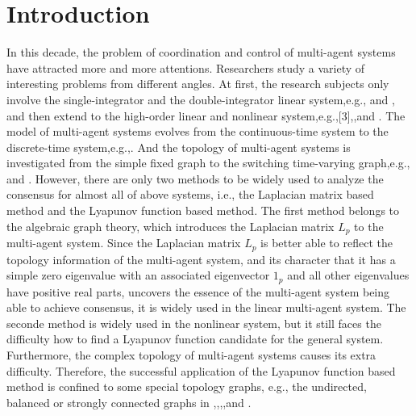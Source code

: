 \documentclass[english]{cccconf}
\begin{document}
\section{Introduction}
In this decade, the problem of coordination and control of multi-agent systems have attracted more and more attentions.  Researchers study a variety of interesting problems from different angles. At first, the research subjects only involve the single-integrator and the double-integrator linear system,e.g.,\cite{Ren2008} and \cite{Mesbahi2010}, and then extend to the high-order linear and nonlinear system,e.g.,[3],\cite{Kim2011},and \cite{Xi2012}. The model of multi-agent systems evolves from the continuous-time system to the discrete-time system,e.g.,\cite{Su2012}. And the topology of multi-agent systems is investigated from the simple fixed graph to the switching time-varying graph,e.g.,\cite{Ren2005} and \cite{Olfati2004}. However, there are only two methods to be widely used to analyze the consensus for  almost all of above systems, i.e., the Laplacian matrix  based method and the Lyapunov function based method. The first method belongs to the algebraic graph theory, which introduces the Laplacian matrix $L_p$ to the multi-agent system. Since the Laplacian matrix $L_p$ is better able to reflect the topology information of the multi-agent system, and its character that it has a simple zero eigenvalue with an associated eigenvector $1_p$  and all other eigenvalues have positive real parts\cite{Ren2008}, uncovers the essence of the multi-agent system being able to achieve consensus, it is widely used in the linear multi-agent system.  The seconde method is widely used in the nonlinear system, but it still faces the difficulty how to  find a  Lyapunov function candidate for the general system. Furthermore,  the complex topology of multi-agent systems causes  its extra difficulty. Therefore, the successful application of the Lyapunov function based method is confined to some special topology graphs, e.g., the undirected, balanced or strongly connected graphs in \cite{Chopra2012},\cite{Listmann2009},\cite{Das2010},\cite{Nosrati2012},and \cite{Yu2011}.
\end{document}
